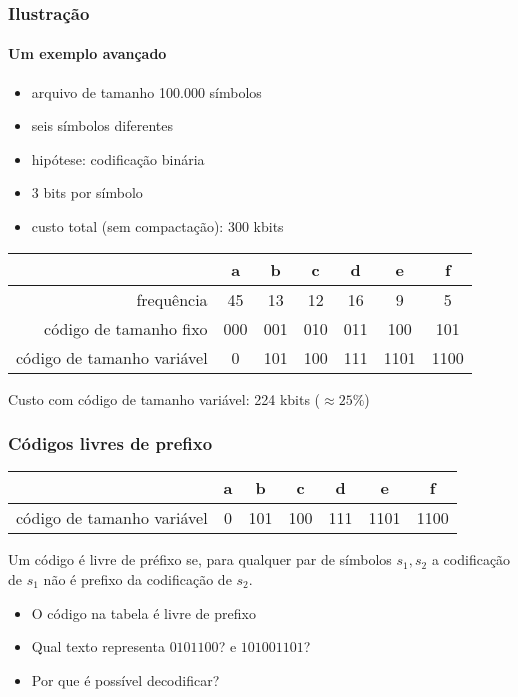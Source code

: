 \documentclass{beamer}
\begin{document}
\begin{frame}
\frametitle{Ilustração}
\framesubtitle{Um exemplo avançado}

\begin{itemize}
\item arquivo de tamanho 100.000 símbolos
\item seis símbolos diferentes
\item hipótese: codificação binária
\item 3 bits por símbolo
\item custo total (sem compactação): 300 kbits
\end{itemize}
\pause
\begin{center}
\begin{tabular}{r|c|c|c|c|c|c|}
& a & b & c & d & e & f \\
\hline
frequência & 45 & 13 & 12 & 16 & 9 & 5 \\
código de tamanho fixo & 000 & 001 & 010 & 011 & 100 & 101 \\
código de tamanho variável & 0 & 101 & 100 & 111 & 1101 & 1100
\end{tabular}
Custo com código de tamanho variável: 224 kbits ($\approx 25\%$)
\end{center}
\end{frame}


\begin{frame}
\frametitle{Códigos livres de prefixo}

\begin{center}
\begin{tabular}{r|c|c|c|c|c|c|}
& a & b & c & d & e & f \\
\hline
código de tamanho variável & 0 & 101 & 100 & 111 & 1101 & 1100
\end{tabular}
\end{center}

\begin{definition}
Um código é livre de préfixo se, para qualquer par de símbolos $s_1, s_2$
a codificação de $s_1$ não é prefixo da codificação de $s_2$.
\end{definition}

\begin{itemize}
\item O código na tabela é livre de prefixo
\item Qual texto representa $0101100$? e $101001101$?
\item Por que é possível decodificar?
\end{itemize}
\end{frame}
\end{document}
